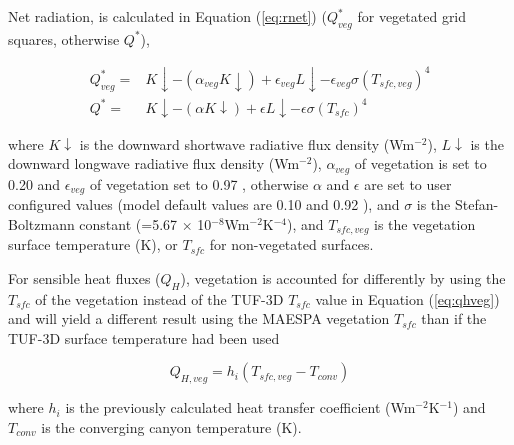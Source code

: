 \documentclass[final,3p,times,authoryear]{elsarticle}
\begin{document}
Net radiation, is calculated in Equation (\ref{eq:rnet}) ($Q^{*}_{veg}$ for vegetated grid squares, otherwise $Q^{*}$), 


\begin{equation}\label{eq:rnet}
\begin{split}
Q^{*}_{veg} =& K\downarrow - (\alpha _{veg} K\downarrow) + \epsilon _{veg} L\downarrow - \epsilon _{veg} \sigma  (T_{sfc,veg}) ^{4} 
\\
Q^{*} =& K\downarrow - (\alpha K\downarrow) + \epsilon L\downarrow - \epsilon \sigma  (T_{sfc}) ^{4} 
\end{split}
\end{equation}

where $K\downarrow$ is the downward shortwave radiative flux density (Wm$^{-2}$), $L\downarrow$ is the downward longwave radiative flux density (Wm$^{-2}$), $\alpha _{veg}$ of vegetation is set to 0.20 and $\epsilon _{veg}$ of vegetation set to 0.97 \citep[p. 12]{Oke1987z}, otherwise $\alpha$ and $\epsilon$ are set to user configured values (model default values are 0.10 and 0.92 \citep{Krayenhoff2007}), and $\sigma$ is the Stefan-Boltzmann constant (=5.67 $\times$ 10$^{-8}$Wm$^{-2}$K$^{-4}$), and $T_{sfc,veg}$ is the vegetation surface temperature (K), or $T_{sfc}$ for non-vegetated surfaces.


For sensible heat fluxes ($Q_{H}$), vegetation is accounted for differently by using the $T_{sfc}$ of the vegetation instead of the TUF-3D $T_{sfc}$ value in Equation (\ref{eq:qhveg}) and will yield a different result using the MAESPA vegetation $T_{sfc}$ than if the TUF-3D surface temperature had been used

\begin{equation}\label{eq:qhveg}
 Q_{H,veg} = h_{i}  (T_{sfc,veg}-T_{conv}) 
\end{equation}

where $h_{i}$ is the previously calculated heat transfer coefficient (Wm$^{-2}$K$^{-1}$) and $T_{conv}$ is the converging canyon temperature (K).
\end{document}
